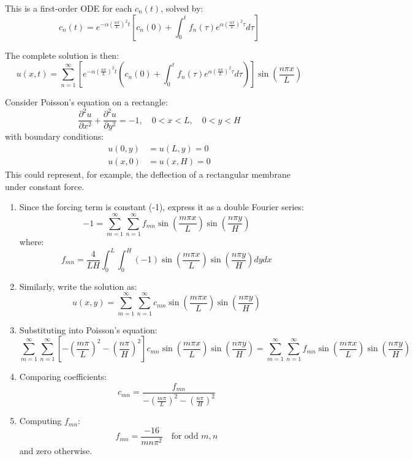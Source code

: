 \noindent This is a first-order ODE for each $c_n(t)$, solved by:
\[
c_n(t) = e^{-\alpha(\frac{n\pi}{L})^2t}\left[c_n(0) + \int_0^t f_n(\tau)e^{\alpha(\frac{n\pi}{L})^2\tau}d\tau\right]
\]

\noindent The complete solution is then:
\[
u(x,t) = \sum_{n=1}^{\infty}\left[e^{-\alpha(\frac{n\pi}{L})^2t}\left(c_n(0) + \int_0^t f_n(\tau)e^{\alpha(\frac{n\pi}{L})^2\tau}d\tau\right)\right]\sin\left(\frac{n\pi x}{L}\right)
\]

\exampleline
\begin{example} 
Consider Poisson's equation on a rectangle:
\[
\frac{\partial^2 u}{\partial x^2} + \frac{\partial^2 u}{\partial y^2} = -1, \quad 0 < x < L, \quad 0 < y < H
\]
with boundary conditions:
\begin{align*}
u(0,y) &= u(L,y) = 0 \\
u(x,0) &= u(x,H) = 0
\end{align*}
This could represent, for example, the deflection of a rectangular membrane under constant force.

\begin{solution}
\begin{enumerate}
\item Since the forcing term is constant (-1), express it as a double Fourier series:
   \[
   -1 = \sum_{m=1}^{\infty}\sum_{n=1}^{\infty} f_{mn}\sin\left(\frac{m\pi x}{L}\right)\sin\left(\frac{n\pi y}{H}\right)
   \]
   where:
   \[
   f_{mn} = \frac{4}{LH}\int_0^L\int_0^H (-1)\sin\left(\frac{m\pi x}{L}\right)\sin\left(\frac{n\pi y}{H}\right)dydx
   \]

\item Similarly, write the solution as:
   \[
   u(x,y) = \sum_{m=1}^{\infty}\sum_{n=1}^{\infty} c_{mn}\sin\left(\frac{m\pi x}{L}\right)\sin\left(\frac{n\pi y}{H}\right)
   \]

\item Substituting into Poisson's equation:
   \[
   \sum_{m=1}^{\infty}\sum_{n=1}^{\infty} \left[-\left(\frac{m\pi}{L}\right)^2 - \left(\frac{n\pi}{H}\right)^2\right]c_{mn}\sin\left(\frac{m\pi x}{L}\right)\sin\left(\frac{n\pi y}{H}\right) = \sum_{m=1}^{\infty}\sum_{n=1}^{\infty} f_{mn}\sin\left(\frac{m\pi x}{L}\right)\sin\left(\frac{n\pi y}{H}\right)
   \]

\item Comparing coefficients:
   \[
   c_{mn} = \frac{f_{mn}}{-\left(\frac{m\pi}{L}\right)^2 - \left(\frac{n\pi}{H}\right)^2}
   \]

\item Computing $f_{mn}$:
   \[
   f_{mn} = \frac{-16}{mn\pi^2} \quad \text{for odd } m,n
   \]
   and zero otherwise.


\end{enumerate}
\end{solution}
\end{example}
